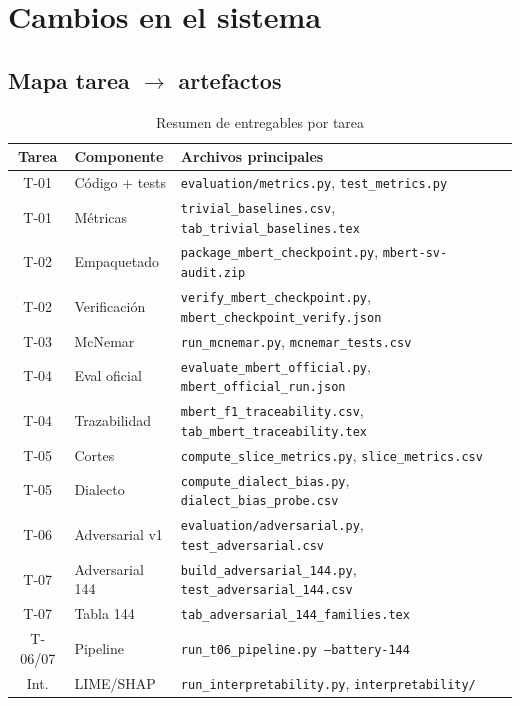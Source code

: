 \chapter{Cambios en el sistema}

\section{Mapa tarea $\rightarrow$ artefactos}

\begin{table}[H]
  \centering
  \caption{Resumen de entregables por tarea}
  \label{tab:deliverables}
  \small
  \begin{tabular}{clp{6.5cm}}
    \toprule
    Tarea & Componente & Archivos principales \\
    \midrule
    T-01 & Código + tests & \texttt{evaluation/metrics.py}, \texttt{test\_metrics.py} \\
    T-01 & Métricas & \texttt{trivial\_baselines.csv}, \texttt{tab\_trivial\_baselines.tex} \\
    T-02 & Empaquetado & \texttt{package\_mbert\_checkpoint.py}, \texttt{mbert-sv-audit.zip} \\
    T-02 & Verificación & \texttt{verify\_mbert\_checkpoint.py}, \texttt{mbert\_checkpoint\_verify.json} \\
    T-03 & McNemar & \texttt{run\_mcnemar.py}, \texttt{mcnemar\_tests.csv} \\
    T-04 & Eval oficial & \texttt{evaluate\_mbert\_official.py}, \texttt{mbert\_official\_run.json} \\
    T-04 & Trazabilidad & \texttt{mbert\_f1\_traceability.csv}, \texttt{tab\_mbert\_traceability.tex} \\
    T-05 & Cortes & \texttt{compute\_slice\_metrics.py}, \texttt{slice\_metrics.csv} \\
    T-05 & Dialecto & \texttt{compute\_dialect\_bias.py}, \texttt{dialect\_bias\_probe.csv} \\
    T-06 & Adversarial v1 & \texttt{evaluation/adversarial.py}, \texttt{test\_adversarial.csv} \\
    T-07 & Adversarial 144 & \texttt{build\_adversarial\_144.py}, \texttt{test\_adversarial\_144.csv} \\
    T-07 & Tabla 144 & \texttt{tab\_adversarial\_144\_families.tex} \\
    T-06/07 & Pipeline & \texttt{run\_t06\_pipeline.py --battery-144} \\
    Int. & LIME/SHAP & \texttt{run\_interpretability.py}, \texttt{interpretability/} \\
    \bottomrule
  \end{tabular}
\end{table}

